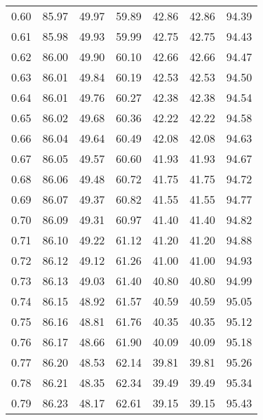 \begin{tabular}{|c|c|c|c|c|c|c|}
      0.60 &     85.97 &     49.97 &      59.89 &   42.86 &      42.86 &         94.39 \\
      0.61 &     85.98 &     49.93 &      59.99 &   42.75 &      42.75 &         94.43 \\
      0.62 &     86.00 &     49.90 &      60.10 &   42.66 &      42.66 &         94.47 \\
      0.63 &     86.01 &     49.84 &      60.19 &   42.53 &      42.53 &         94.50 \\
      0.64 &     86.01 &     49.76 &      60.27 &   42.38 &      42.38 &         94.54 \\
      0.65 &     86.02 &     49.68 &      60.36 &   42.22 &      42.22 &         94.58 \\
      0.66 &     86.04 &     49.64 &      60.49 &   42.08 &      42.08 &         94.63 \\
      0.67 &     86.05 &     49.57 &      60.60 &   41.93 &      41.93 &         94.67 \\
      0.68 &     86.06 &     49.48 &      60.72 &   41.75 &      41.75 &         94.72 \\
      0.69 &     86.07 &     49.37 &      60.82 &   41.55 &      41.55 &         94.77 \\
      0.70 &     86.09 &     49.31 &      60.97 &   41.40 &      41.40 &         94.82 \\
      0.71 &     86.10 &     49.22 &      61.12 &   41.20 &      41.20 &         94.88 \\
      0.72 &     86.12 &     49.12 &      61.26 &   41.00 &      41.00 &         94.93 \\
      0.73 &     86.13 &     49.03 &      61.40 &   40.80 &      40.80 &         94.99 \\
      0.74 &     86.15 &     48.92 &      61.57 &   40.59 &      40.59 &         95.05 \\
      0.75 &     86.16 &     48.81 &      61.76 &   40.35 &      40.35 &         95.12 \\
      0.76 &     86.17 &     48.66 &      61.90 &   40.09 &      40.09 &         95.18 \\
      0.77 &     86.20 &     48.53 &      62.14 &   39.81 &      39.81 &         95.26 \\
      0.78 &     86.21 &     48.35 &      62.34 &   39.49 &      39.49 &         95.34 \\
      0.79 &     86.23 &     48.17 &      62.61 &   39.15 &      39.15 &         95.43 \\

\end{tabular}
